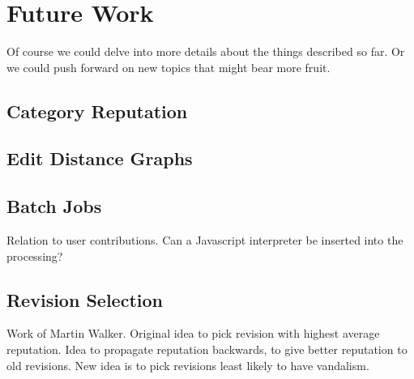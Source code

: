 \section{Future Work}

Of course we could delve into more details about
the things described so far.  Or we could push forward
on new topics that might bear more fruit.

\subsection{Category Reputation}
\subsection{Edit Distance Graphs}

\subsection{Batch Jobs}

    Relation to user contributions.
    Can a Javascript interpreter be inserted into the processing?

\subsection{Revision Selection}

    Work of Martin Walker.
    Original idea to pick revision with highest average reputation.
    Idea to propagate reputation backwards, to give better reputation
    to old revisions.
    New idea is to pick revisions least likely to have vandalism.



